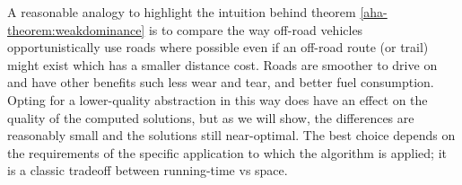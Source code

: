 \par \indent
A reasonable analogy to highlight the intuition behind theorem \ref{aha-theorem:weakdominance} is to compare the way off-road vehicles opportunistically use roads where possible even if an off-road route (or trail) might exist which has a smaller distance cost. Roads are smoother to drive on and have other benefits such less wear and tear, and better fuel consumption. 
Opting for a lower-quality abstraction in this way does have an effect on the quality of the computed solutions, but as we will show, the differences are reasonably small and the solutions still near-optimal. The best choice depends on the requirements of the specific application to which the algorithm is applied; it is a classic tradeoff between running-time vs space.
